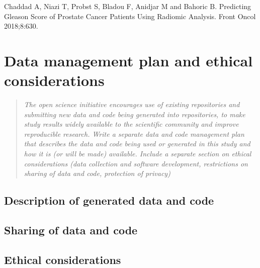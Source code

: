 \documentclass[11pt]{article}
\begin{document}
\vspace{3mm}

\begin{thebibliography}{1} 
  Chaddad A, Niazi T, Probst S, Bladou F, Anidjar M and Bahoric B. Predicting Gleason Score of Prostate Cancer Patients Using Radiomic Analysis.
Front Oncol 2018;8:630. 
\end{thebibliography}

\newpage


\section{Data management plan and ethical considerations} %

\begin{quote} 
{\scriptsize \it  The open science initiative encourages use of existing repositories and submitting new data and code being generated into repositories, to make study results widely available to the scientific community and improve reproducible research.
Write a separate data and code management plan that describes the data and code being used or generated in this study and how it is (or will be made) available. Include a separate section on ethical considerations (data collection and software development, restrictions on sharing of data and code, protection of privacy)}
\end{quote}

\vspace{3mm}

\subsection{Description of generated data and code}

\vspace{3mm}

\subsection{Sharing of data and code}

\vspace{3mm}

\subsection{Ethical considerations}
\end{document}
